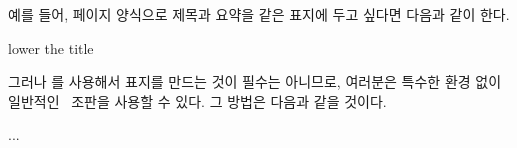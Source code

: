 예를 들어,  페이지 양식으로 제목과 요약을 같은
표지에 두고 싶다면 다음과 같이 한다.
\begin{lcode}

\begin{titlingpage}
\setlength{\droptitle}{30pt} lower the title
\maketitle
\begin{abstract}...\end{abstract}
\end{titlingpage}
\end{lcode}

그러나 를 사용해서 표지를 만드는 것이 필수는 아니므로,
여러분은 특수한 환경 없이 일반적인 \ltx\ 조판을 사용할 수 있다.
그 방법은 다음과 같을 것이다.
\begin{lcode}
\pagestyle{empty}
\cleardoublepage
...
\end{lcode}

